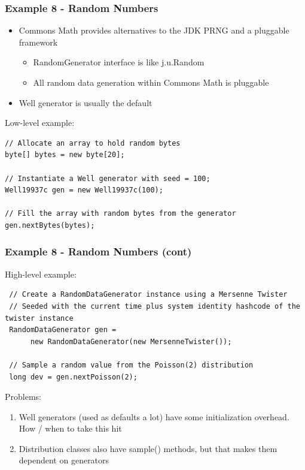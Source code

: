 \documentclass[14pt,mathserif]{beamer}
\begin{document}
\begin{frame}[fragile]
  \frametitle{Example 8 - Random Numbers}
  
\begin{small}
\begin{itemize}  
\item Commons Math provides alternatives to the JDK PRNG and a pluggable framework
\begin{itemize}
\item RandomGenerator interface is like j.u.Random
\item All random data generation within Commons Math is pluggable
\end {itemize}
\item Well generator is usually the default
\end{itemize}

Low-level example:

\begin{verbatim}
// Allocate an array to hold random bytes
byte[] bytes = new byte[20];

// Instantiate a Well generator with seed = 100;
Well19937c gen = new Well19937c(100);

// Fill the array with random bytes from the generator
gen.nextBytes(bytes);
\end{verbatim}
\end{small}
\end{frame}

\begin{frame}[fragile]
  \frametitle{Example 8 - Random Numbers (cont)}  
  
High-level example:

\begin{verbatim}
 // Create a RandomDataGenerator instance using a Mersenne Twister 
 // Seeded with the current time plus system identity hashcode of the twister instance
 RandomDataGenerator gen = 
      new RandomDataGenerator(new MersenneTwister());
      
 // Sample a random value from the Poisson(2) distribution
 long dev = gen.nextPoisson(2);
 \end{verbatim}

Problems:
\begin{enumerate}
\item Well generators (used as defaults a lot) have some initialization overhead.  How
/ when to take this hit
\item Distribution classes also have sample() methods, but that makes them dependent on
generators
\end{enumerate}
\end{frame}
\end{document}
